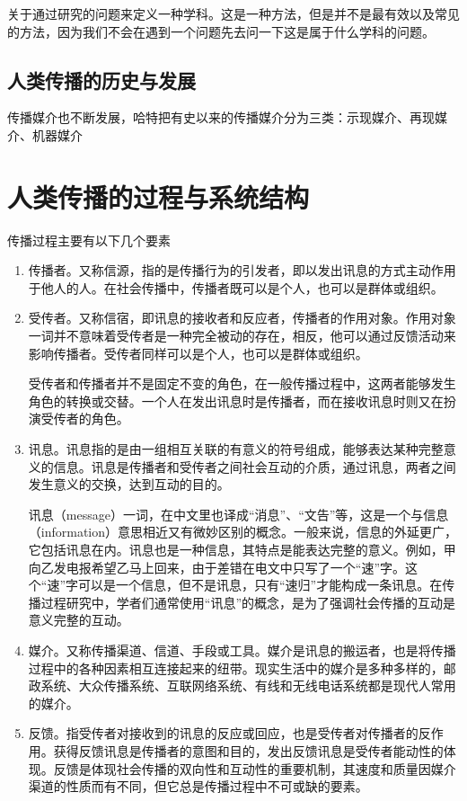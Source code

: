 \documentclass[UTF8,12pt]{ctexart}
\numberwithin{equation}{section} %
\numberwithin{figure}{section}
\numberwithin{table}{section}
\begin{document}
	关于通过研究的问题来定义一种学科。这是一种方法，但是并不是最有效以及常见的方法，因为我们不会在遇到一个问题先去问一下这是属于什么学科的问题。
	
	\subsection{人类传播的历史与发展}
	传播媒介也不断发展，哈特把有史以来的传播媒介分为三类：示现媒介、再现媒介、机器媒介

	\section{人类传播的过程与系统结构}
	传播过程主要有以下几个要素
	\begin{enumerate}
		\item 传播者。又称信源，指的是传播行为的引发者，即以发出讯息的方式主动作用于他人的人。在社会传播中，传播者既可以是个人，也可以是群体或组织。
		
		\item 受传者。又称信宿，即讯息的接收者和反应者，传播者的作用对象。作用对象一词并不意味着受传者是一种完全被动的存在，相反，他可以通过反馈活动来影响传播者。受传者同样可以是个人，也可以是群体或组织。
		
		受传者和传播者并不是固定不变的角色，在一般传播过程中，这两者能够发生角色的转换或交替。一个人在发出讯息时是传播者，而在接收讯息时则又在扮演受传者的角色。
		
		\item 讯息。讯息指的是由一组相互关联的有意义的符号组成，能够表达某种完整意义的信息。讯息是传播者和受传者之间社会互动的介质，通过讯息，两者之间发生意义的交换，达到互动的目的。
		
		讯息（message）一词，在中文里也译成“消息”、“文告”等，这是一个与信息（information）意思相近又有微妙区别的概念。一般来说，信息的外延更广，它包括讯息在内。讯息也是一种信息，其特点是能表达完整的意义。例如，甲向乙发电报希望乙马上回来，由于差错在电文中只写了一个“速”字。这个“速”字可以是一个信息，但不是讯息，只有“速归”才能构成一条讯息。在传播过程研究中，学者们通常使用“讯息”的概念，是为了强调社会传播的互动是意义完整的互动。
		
		\item 媒介。又称传播渠道、信道、手段或工具。媒介是讯息的搬运者，也是将传播过程中的各种因素相互连接起来的纽带。现实生活中的媒介是多种多样的，邮政系统、大众传播系统、互联网络系统、有线和无线电话系统都是现代人常用的媒介。
		
		\item 反馈。指受传者对接收到的讯息的反应或回应，也是受传者对传播者的反作用。获得反馈讯息是传播者的意图和目的，发出反馈讯息是受传者能动性的体现。反馈是体现社会传播的双向性和互动性的重要机制，其速度和质量因媒介渠道的性质而有不同，但它总是传播过程中不可或缺的要素。
	\end{enumerate}
	
\end{document}
